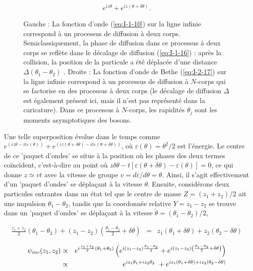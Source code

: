 \begin{eqnarray}
	e^{iz \theta } + e^{ i z ( \theta + \delta \theta )}.
\end{eqnarray}

\begin{figure}[H]
	\centering
  \caption{Gauche : La fonction d'onde (\ref{eq:I-1-10}) sur la ligne infinie correspond à un processus de diffusion à deux corps. Semiclassiquement, la phase de diffusion dans ce processus à deux corps se reflète dans le décalage de diffusion (\ref{eq:I-1-16}) : après la collision, la position de la particule a été déplacée d'une distance $\Delta ( \theta_1 - \theta_2 )$ . Droite : La fonction d'onde de Bethe (\ref{eq:I-2-17}) sur la ligne infinie correspond à un processus de diffusion à $N$-corps qui se factorise en des processus à deux corps (le décalage de diffusion $\Delta$ est également présent ici, mais il n'est pas représenté dans la caricature). Dans ce processus à $N$-corps, les rapidités $\theta_j$ sont les moments asymptotiques des bosons.}
  \label{}	
\end{figure}

Une telle superposition évolue dans le temps comme $e^{(iz\theta -it\varepsilon(\theta))} + e^{(iz(\theta + \delta \theta )  -it\varepsilon(\theta + \delta \theta ))}$, où $\varepsilon(\theta) = \theta ^2/2$ est l'énergie. Le centre de ce 'paquet d'ondes' se situe à la position où les phases des deux termes coïncident, c'est-à-dire au point où $z\delta \theta  - t[\varepsilon(\theta + \delta \theta ) - \varepsilon(\theta)] = 0$, ce qui donne $z \simeq vt$ avec la vitesse de groupe $v = d\varepsilon/d\theta = \theta$. Ainsi, il s'agit effectivement d'un 'paquet d'ondes' se déplaçant à la vitesse $\theta$. Ensuite, considérons deux particules entrantes dans un état tel que le centre de masse $Z = (z_1 + z_2)/2$ ait une impulsion $\theta_1 - \theta_2$, tandis que la coordonnée relative $Y = z_1 - z_2$ se trouve dans un 'paquet d'ondes' se déplaçant à la vitesse $\tilde{\theta} = (\theta_1 - \theta_2)/2$,

{\color{gray}
\begin{eqnarray*}
	\frac{ z_1 + z_2}{2} ( \theta_1 - \theta_2 ) + ( z_1 - z_2 ) \left ( \frac{ \theta_1 -\theta_2}{2} + \delta \theta  \right ) & = & z_1 ( \theta_1  + \delta \theta ) + z_2 ( \theta_2 - \delta \theta )  
\end{eqnarray*}
}

\begin{eqnarray}
	\psi_{inc} ( z_1 , z_2 ) & \propto & e^{i \frac{ z_1 + z_2 }{2} ( \theta_1 + \theta_2 ) }  \left ( e^{i ( z_1 - z_2 ) \frac{ \theta_1 - \theta_2}{2} } +  e^{i ( z_1 - z_2 )  \left ( \frac{ \theta_1 - \theta_2}{2}+ \delta \theta  \right )  } \right )\notag  \\
	& \propto & e^{ i z_1 \theta_1 + i z_2 \theta_2 } + 	 e^{ i z_1 ( \theta_1 + \delta \theta )  + i z_2  ( \theta_2 - \delta \theta)   }%
\end{eqnarray}

